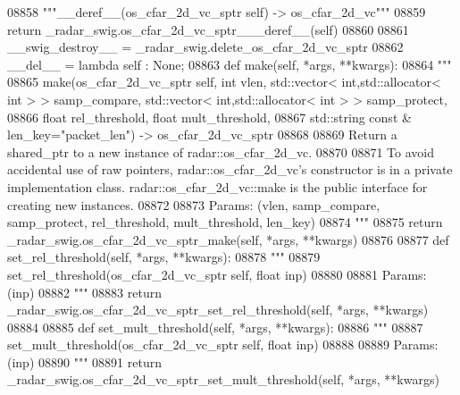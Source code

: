 \begin{DoxyCode}
{{{{{{{{{{{{{{{{{{{{{{{{{{{{{08858         \textcolor{stringliteral}{"""\_\_deref\_\_(os\_cfar\_2d\_vc\_sptr self) -> os\_cfar\_2d\_vc"""}
08859         \textcolor{keywordflow}{return} \_radar\_swig.os\_cfar\_2d\_vc\_sptr\_\_\_deref\_\_(self)
08860 
08861     \_\_swig\_destroy\_\_ = \_radar\_swig.delete\_os\_cfar\_2d\_vc\_sptr
08862     \_\_del\_\_ = \textcolor{keyword}{lambda} self : \textcolor{keywordtype}{None};
08863     \textcolor{keyword}{def }make(self, *args, **kwargs):
08864         \textcolor{stringliteral}{"""}
08865 \textcolor{stringliteral}{        make(os\_cfar\_2d\_vc\_sptr self, int vlen, std::vector< int,std::allocator< int > > samp\_compare,
       std::vector< int,std::allocator< int > > samp\_protect, }
08866 \textcolor{stringliteral}{            float rel\_threshold, float mult\_threshold, }
08867 \textcolor{stringliteral}{            std::string const & len\_key="packet\_len") -> os\_cfar\_2d\_vc\_sptr}
08868 \textcolor{stringliteral}{}
08869 \textcolor{stringliteral}{        Return a shared\_ptr to a new instance of radar::os\_cfar\_2d\_vc.}
08870 \textcolor{stringliteral}{}
08871 \textcolor{stringliteral}{        To avoid accidental use of raw pointers, radar::os\_cfar\_2d\_vc's constructor is in a private
       implementation class. radar::os\_cfar\_2d\_vc::make is the public interface for creating new instances.}
08872 \textcolor{stringliteral}{}
08873 \textcolor{stringliteral}{        Params: (vlen, samp\_compare, samp\_protect, rel\_threshold, mult\_threshold, len\_key)}
08874 \textcolor{stringliteral}{        """}
08875         \textcolor{keywordflow}{return} \_radar\_swig.os\_cfar\_2d\_vc\_sptr\_make(self, *args, **kwargs)
08876 
08877     \textcolor{keyword}{def }set_rel_threshold(self, *args, **kwargs):
08878         \textcolor{stringliteral}{"""}
08879 \textcolor{stringliteral}{        set\_rel\_threshold(os\_cfar\_2d\_vc\_sptr self, float inp)}
08880 \textcolor{stringliteral}{}
08881 \textcolor{stringliteral}{        Params: (inp)}
08882 \textcolor{stringliteral}{        """}
08883         \textcolor{keywordflow}{return} \_radar\_swig.os\_cfar\_2d\_vc\_sptr\_set\_rel\_threshold(self, *args, **kwargs)
08884 
08885     \textcolor{keyword}{def }set_mult_threshold(self, *args, **kwargs):
08886         \textcolor{stringliteral}{"""}
08887 \textcolor{stringliteral}{        set\_mult\_threshold(os\_cfar\_2d\_vc\_sptr self, float inp)}
08888 \textcolor{stringliteral}{}
08889 \textcolor{stringliteral}{        Params: (inp)}
08890 \textcolor{stringliteral}{        """}
08891         \textcolor{keywordflow}{return} \_radar\_swig.os\_cfar\_2d\_vc\_sptr\_set\_mult\_threshold(self, *args, **kwargs)
}}}}}}}}}}}}}}}}}}}}}}}}}}}}}
\end{DoxyCode}
